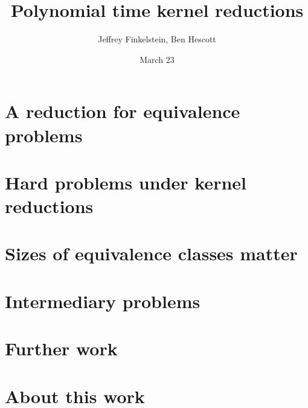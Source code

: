 \documentclass{lposter-with-tkz-graph} %
\title{Polynomial time kernel reductions}
\author{Jef{}frey Finkelstein, Ben Hescott}
\date{March 23}
\theoremstyle{definition} \newtheorem*{definition}{Definition}
\begin{document}
\begin{poster}


\section{A reduction for equivalence problems}


\columnbreak




\section{Hard problems under kernel reductions}


\section{Sizes of equivalence classes matter}


\columnbreak


\section{Intermediary problems}


\section{Further work}


\section{About this work}


\end{poster}
\end{document}
